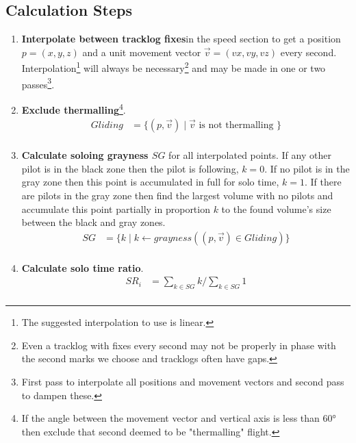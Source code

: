 \documentclass[gap.tex]{subfiles}
\begin{document}
\newpage
\subsection{Calculation Steps}

\begin{enumerate}
    \item \textbf{Interpolate between tracklog fixes}\footnotemark in the speed
        section to get a position \(p = (x, y, z)\) and a unit movement vector
        \(\vec{v} = (vx, vy, vz)\) every second. Interpolation\footnote{The
        suggested interpolation to use is linear.} will always be
        necessary\footnote{Even a tracklog with fixes every second may not be
        properly in phase with the second marks we choose and tracklogs often
        have gaps.} and may be made in one or two passes\footnote{First pass to
        interpolate all positions and movement vectors and second pass to
        dampen these.}.

    \item \textbf{Exclude thermalling}\footnote{If the angle between the
        movement vector and vertical axis is less than 60° then exclude that
        second deemed to be "thermalling" flight.}.
        \begin{align*}
            Gliding &= \{ (p, \vec{v}) \mid \vec{v} \text{ is not thermalling }\} \\
        \end{align*}
    

    \item \textbf{Calculate soloing grayness \(SG\)} for all interpolated
        points. If any other pilot is in the black zone then the pilot is
        following, \(k = 0\). If no pilot is in the gray zone then this point
        is accumulated in full for solo time, \(k = 1\). If there are pilots in
        the gray zone then find the largest volume with no pilots and
        accumulate this point partially in proportion \(k\) to the found
        volume's size between the black and gray zones.
        \begin{align*}
            SG &= \{ k \mid k \leftarrow grayness ((p, \vec{v}) \in Gliding)\} \\
        \end{align*}
    
    \item \textbf{Calculate solo time ratio}.
        \begin{align*}
            SR_i &= \sum_{k \in SG} k / \sum_{k \in SG} 1 \\
        \end{align*}
    

\end{enumerate}
\end{document}
